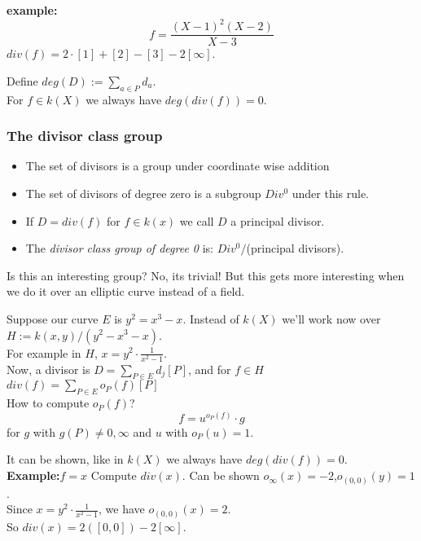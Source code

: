 \documentclass[shadesubsections,compress,14pt,mathserif]{beamer}
\newcommand{\defeq}{\ensuremath{:=}}
\begin{document}
\begin{frame}
\textbf{example:}
$$f=\frac{(X-1)^2(X-2)}{X-3}$$
$div(f)=2\cdot[1]+[2]-[3]-2[\infty]$.\pause

Define $deg(D)\defeq \sum_{a\in P} d_a$.\\  
For $f\in k(X)$ we always have $deg(div(f))=0$.

\end{frame}
\begin{frame}
 \frametitle{The divisor class group}
 \begin{itemize}
  \item The set of divisors is a group under coordinate wise addition\pause
  \item The set of divisors of degree zero is a subgroup $Div^0$ under this rule.\pause
  \item If $D=div(f)$ for $f\in k(x)$ we call $D$ a principal divisor.\pause
  \item The \emph{divisor class group of degree 0} is: $Div^0/$(principal divisors).
  
 \end{itemize}
Is this an interesting group?\pause
No, its trivial!
But this gets more interesting when we do it over an elliptic curve instead of a field.
\end{frame}
\begin{frame}
Suppose our curve $E$ is $y^2=x^3-x$.
Instead of $k(X)$ we'll work now over $H\defeq k(x,y)/(y^2-x^3-x)$. \\ \pause
\vspace{0.2in}
For example in $H$, $x=y^2\cdot\frac{1}{x^2-1}$.\\ \pause
\vspace{0.2in}
Now, a divisor is $D=\sum_{P\in E}d_j [P]$,
and for $f\in H$
$div(f)=\sum_{P\in E} o_P(f)[P]$\\ \pause
How to compute $o_P(f)$? \\
$$f=u^{o_P(f)} \cdot g$$ 
for $g$ with $g(P)\neq 0,\infty$
and $u$ with $o_P(u)=1$.

\end{frame}
\begin{frame}
It can be shown, like in $k(X)$ we always have $deg(div(f))=0$.\\ \pause
\vspace{0.2in}
 \textbf{Example:$f=x$}
 Compute $div(x)$.
 Can be shown $o_{\infty}(x) =-2$,$o_{(0,0)}(y)=1$.\\ \pause
 \vspace{0.2in}
 Since $x=y^2\cdot\frac{1}{x^2-1}$, we have $o_{(0,0)} (x)= 2$.\\
 \vspace{0.2in}
So $div(x) = 2([0,0]) - 2[\infty]$. 
 
\end{frame}
\end{document}
